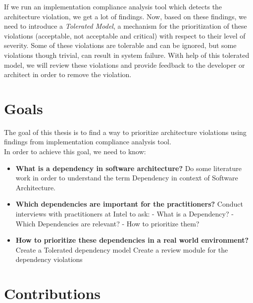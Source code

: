If we run an implementation compliance analysis tool which detects the architecture violation, we get a lot of findings. Now, based on these findings, we need to introduce a \textit{Tolerated Model}, a mechanism for the prioritization of these violations (acceptable, not acceptable and critical) with respect to their level of severity. Some of these violations are tolerable and can be ignored, but some violations though trivial, can  result in system failure. With help of this tolerated model, we will review these violations and provide feedback to the developer or architect in order to remove the violation.  

\section{Goals}
The goal of this thesis is to find a way to prioritize architecture violations using findings from implementation compliance analysis tool. \\In order to achieve this goal, we need to know:

\begin{itemize}
	\item \textbf{What is a dependency in software architecture?}\newline
				Do some literature work in order to understand the term Dependency in context of Software Architecture.
	\item \textbf{Which dependencies are important for the practitioners?} \newline
				Conduct interviews with practitioners at Intel to ask: \newline
				- What is a Dependency? \newline
				- Which Dependencies are relevant? \newline
				- How to prioritize them?	 
	\item \textbf{How to prioritize these dependencies in a real world environment?} \newline
				Create a Tolerated dependency model
				Create a review module for the dependency violations		
\end{itemize}

\section{Contributions}\label{contributions}